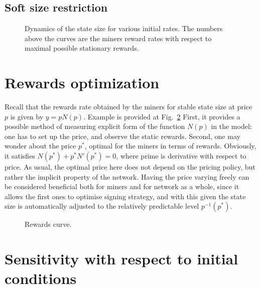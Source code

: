 \documentclass[preprint]{revtex4-1}
\begin{document}
\subsection{Soft size restriction}

\begin{figure}
    
    \caption{
        \label{fig:dynamics} Dynamics of the state size for various initial
        rates. The numbers above the curves are the miners reward rates with
        respect to maximal possible stationary rewards.
    }
\end{figure}
\section{Rewards optimization}

Recall that the rewards rate obtained by the miners for stable state size at
price $p$ is given by $y=pN(p)$. Example is provided at Fig.~\ref{fig:rewards}
First, it provides a possible method of measuring explicit form of the function
$N(p)$ in the model: one has to set up the price, and observe the static
rewards. Second, one may wonder about the price $p^*$, optimal for the miners in
terms of rewards. Obviously, it satisfies $N(p^*)+p^*N'(p^*)=0$, where prime is
derivative with respect to price. As usual, the optimal price here does not
depend on the pricing policy, but rather the implicit property of the network.
Having the price varying freely can be considered beneficial both for miners and
for network as a whole, since it allows the first ones to optimise signing
strategy, and with this given the state size is automatically adjusted to the relatively
predictable level $p^{-1}(p^*)$.

\begin{figure}
    
    \caption{
        \label{fig:rewards} Rewards curve.
    }
\end{figure}

\section{Sensitivity with respect to initial conditions}
\end{document}
